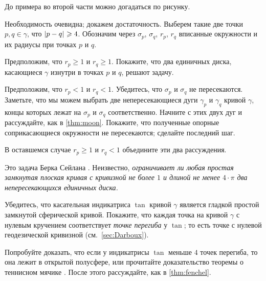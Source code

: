 До примера во второй части можно догадаться по рисунку.






Необходимость очевидна; докажем достаточность.
Выберем такие две точки $p,q\in\gamma$, что $\dist{p}{q}{}\ge 4$.
Обозначим через $\sigma_p$, $\sigma_q$, $r_p$, $r_q$ вписанные окружности и их радиусы при точках $p$ и $q$.

Предположим, что $r_p\ge 1$ и $r_q\ge 1$.
Покажите, что два единичных диска, касающиеся $\gamma$ изнутри в точках $p$ и $q$, решают задачу.

Предположим, что $r_p<1$ и $r_q<1$.
Убедитесь, что $\sigma_p$ и $\sigma_q$ не пересекаются.
Заметьте, что мы можем выбрать две непересекающиеся дуги $\gamma_p$ и $\gamma_q$ кривой $\gamma$, концы которых лежат на $\sigma_p$ и $\sigma_q$ соответственно.
Начните с этих двух дуг и рассуждайте, как в \ref{thm:moon}.
Покажите, что полученные опорные соприкасающиеся окружности не пересекаются; сделайте последний шаг.

В оставшемся случае $r_p\ge 1$ и $r_q<1$ объедините эти два рассуждения.

 Это задача Берка Сейлана \cite{ceylan}.
Неизвестно, \textit{ограничивает ли любая простая замкнутая плоская кривая с кривизной не более $1$ и длиной не менее $4\cdot\pi$ два непересекающихся единичных диска.}

Убедитесь, что касательная индикатриса $\tan$ кривой $\gamma$ является гладкой простой замкнутой сферической кривой.
Покажите, что каждая точка на кривой $\gamma$ с нулевым кручением соответствует \emph{точке перегиба} у $\tan$;
то есть точке с нулевой геодезической кривизной (см.~\ref{sec:Darboux}).

Попробуйте доказать, что если у индикатрисы $\tan$ меньше $4$ точек перегиба, то она лежит в открытой полусфере,
или прочитайте доказательство теоремы о теннисном мячике \cite[§ 20]{arnold1994}.
После этого рассуждайте, как в \ref{thm:fenchel}.

